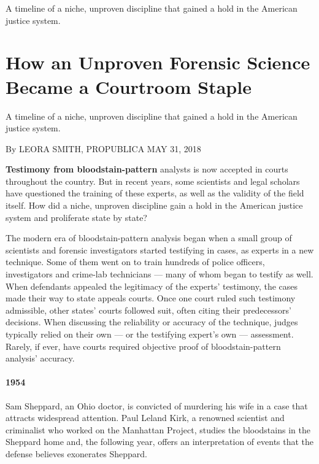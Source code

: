 A timeline of a niche, unproven discipline that gained a hold in the
American justice system.

\hypertarget{how-an-unproven-forensic-science-became-a-courtroom-staple-1}{%
\section{How an Unproven Forensic Science Became a Courtroom
Staple}\label{how-an-unproven-forensic-science-became-a-courtroom-staple-1}}

A timeline of a niche, unproven discipline that gained a hold in the
American justice system.

By LEORA SMITH, PROPUBLICA MAY 31, 2018

\textbf{Testimony from bloodstain-pattern} analysts is now accepted in
courts throughout the country. But in recent years, some scientists and
legal scholars have questioned the training of these experts, as well as
the validity of the field itself. How did a niche, unproven discipline
gain a hold in the American justice system and proliferate state by
state?

The modern era of bloodstain-pattern analysis began when a small group
of scientists and forensic investigators started testifying in cases, as
experts in a new technique. Some of them went on to train hundreds of
police officers, investigators and crime-lab technicians --- many of
whom began to testify as well. When defendants appealed the legitimacy
of the experts' testimony, the cases made their way to state appeals
courts. Once one court ruled such testimony admissible, other states'
courts followed suit, often citing their predecessors' decisions. When
discussing the reliability or accuracy of the technique, judges
typically relied on their own --- or the testifying expert's own ---
assessment. Rarely, if ever, have courts required objective proof of
bloodstain-pattern analysis' accuracy.

\hypertarget{1954}{%
\paragraph{1954}\label{1954}}

Sam Sheppard, an Ohio doctor, is convicted of murdering his wife in a
case that attracts widespread attention. Paul Leland Kirk, a renowned
scientist and criminalist who worked on the Manhattan Project, studies
the bloodstains in the Sheppard home and, the following year, offers an
interpretation of events that the defense believes exonerates Sheppard.

